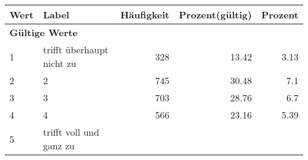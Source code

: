     \begin{longtable}{lXrrr}
     \toprule
     \textbf{Wert} & \textbf{Label} & \textbf{Häufigkeit} & \textbf{Prozent(gültig)} & \textbf{Prozent} \\
     \endhead
     \midrule
     \multicolumn{5}{l}{\textbf{Gültige Werte}}\\

     1 &
     \multicolumn{1}{X}{ trifft überhaupt nicht zu   } &


       \num{328} &
       \num[round-mode=places,round-precision=2]{13.42} &
         \num[round-mode=places,round-precision=2]{3.13} \\

     2 &
     \multicolumn{1}{X}{ 2   } &


       \num{745} &
       \num[round-mode=places,round-precision=2]{30.48} &
         \num[round-mode=places,round-precision=2]{7.1} \\

     3 &
     \multicolumn{1}{X}{ 3   } &


       \num{703} &
       \num[round-mode=places,round-precision=2]{28.76} &
         \num[round-mode=places,round-precision=2]{6.7} \\

     4 &
     \multicolumn{1}{X}{ 4   } &


       \num{566} &
       \num[round-mode=places,round-precision=2]{23.16} &
         \num[round-mode=places,round-precision=2]{5.39} \\

     5 &
     \multicolumn{1}{X}{ trifft voll und ganz zu   } &



\end{longtable}
